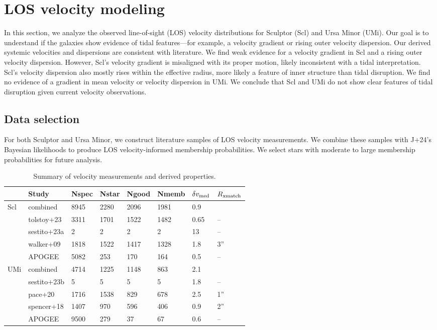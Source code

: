 \chapter{LOS velocity modeling}\label{sec:rv_obs}

In this section, we analyze the observed line-of-sight (LOS) velocity
distributions for Sculptor (Scl) and Ursa Minor (UMi). Our goal is to
understand if the galaxies show evidence of tidal features---for
example, a velocity gradient or rising outer velocity dispersion. Our
derived systemic velocities and dispersions are consistent with
literature. We find weak evidence for a velocity gradient in Scl and a
rising outer velocity dispersion. However, Scl's velocity gradient is
misaligned with its proper motion, likely inconsistent with a tidal
interpretation. Scl's velocity dispersion also mostly rises within the
effective radius, more likely a feature of inner structure than tidal
disruption. We find no evidence of a gradient in mean velocity or
velocity dispersion in UMi. We conclude that Scl and UMi do not show
clear features of tidal disruption given current velocity observations.

\section{Data selection}\label{data-selection}

For both Sculptor and Ursa Minor, we construct literature samples of LOS
velocity measurements. We combine these samples with J+24's Bayesian
likelihoods to produce LOS velocity-informed membership probabilities.
We select stars with moderate to large membership probabilities for
future analysis.

\begin{table*}[t]
\centering
\caption[Spectroscopic LOS velocity measurements]{Summary of velocity measurements and derived properties. }
\label{tbl:rv_measurements}
\begin{tabular}{llllllll}
\toprule
 & Study & Nspec & Nstar & Ngood & Nmemb & $\delta v_{\rm med}$ & $R_{\rm xmatch}$\\
\midrule
Scl & combined & 8945 & 2280 & 2096 & 1981 & 0.9 & \\
 & tolstoy+23 & 3311 & 1701 & 1522 & 1482 & 0.65 & –\\
 & sestito+23a & 2 & 2 & 2 & 2 & 13 & –\\
 & walker+09 & 1818 & 1522 & 1417 & 1328 & 1.8 & 3”\\
 & APOGEE & 5082 & 253 & 170 & 164 & 0.5 & –\\
UMi & combined & 4714 & 1225 & 1148 & 863 & 2.1 & \\
 & sestito+23b & 5 & 5 & 5 & 5 & 1.8 & –\\
 & pace+20 & 1716 & 1538 & 829 & 678 & 2.5 & 1”\\
 & spencer+18 & 1407 & 970 & 596 & 406 & 0.9 & 2”\\
 & APOGEE & 9500 & 279 & 37 & 67 & 0.6 & –\\
\bottomrule
\end{tabular}
\end{table*}

